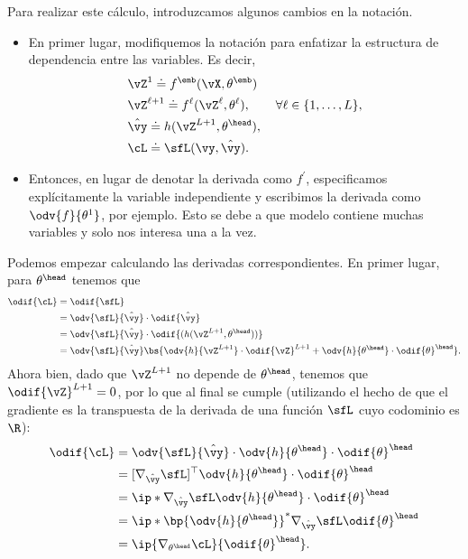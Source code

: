 \documentclass[../../book-main_es.tex]{subfiles}
\begin{document}
Para realizar este cálculo, introduzcamos algunos cambios en la notación.
\begin{itemize}
    \item En primer lugar, modifiquemos la notación para enfatizar la
        estructura de dependencia entre las variables. Es decir,
        \begin{align}
            &\vZ^{1} \doteq f^{\emb}(\vX, \theta^{\emb}) \\
            &\vZ^{\ell + 1} \doteq f^{\ell}(\vZ^{\ell},
            \theta^{\ell}), \qquad \forall \ell \in \{1, \dots, L\}, \\
            &\hat{\vy} \doteq h(\vZ^{L+1}, \theta^{\head}), \\
            &\cL \doteq \sfL(\vy, \hat{\vy}).
        \end{align}
    \item Entonces, en lugar de denotar la derivada como \(f^{\prime}\),
        especificamos explícitamente la variable independiente y escribimos la
        derivada como \(\odv{f}{\theta^{1}}\), por ejemplo. Esto se debe
        a que modelo contiene muchas variables y solo 
        nos interesa una a la vez.
\end{itemize}
Podemos empezar calculando las derivadas correspondientes. En primer lugar, para
\(\theta^{\head}\) tenemos que
\begin{align}
    \odif{\cL}
    &= \odif{\sfL} \\
    &= \odv{\sfL}{\hat{\vy}}\cdot\odif{\hat{\vy}} \\
    &= \odv{\sfL}{\hat{\vy}}\cdot\odif{{(h(\vZ^{L + 1}, \theta^{\head}))}} \\
    &= \odv{\sfL}{\hat{\vy}}\bs{\odv{h}{\vZ^{L +
        1}}\cdot\odif{\vZ}^{L + 1} +
    \odv{h}{\theta^{\head}}\cdot\odif{\theta}^{\head}}.
\end{align}
Ahora bien, dado que \(\vZ^{L + 1}\) no depende de \(\theta^{\head}\), tenemos
que \(\odif{\vZ}^{L + 1} = 0\), por lo que al final se cumple (utilizando el
    hecho de que el gradiente es la transpuesta de la derivada de una
función \(\sfL\) cuyo codominio es \(\R\)):
\begin{align}
    \odif{\cL}
    &=
    \odv{\sfL}{\hat{\vy}}\cdot\odv{h}{\theta^{\head}}\cdot\odif{\theta}^{\head}
    \\
    &=
    [\nabla_{\hat{\vy}}\sfL]^{\top}\odv{h}{\theta^{\head}}\cdot\odif{\theta}^{\head}
    \\
    &=
    \ip*{\nabla_{\hat{\vy}}\sfL}{\odv{h}{\theta^{\head}}\cdot\odif{\theta}^{\head}}
    \\
    &=
    \ip*{\bp{\odv{h}{\theta^{\head}}}^{*}\nabla_{\hat{\vy}}\sfL}{\odif{\theta}^{\head}}
    \\
    &= \ip{\nabla_{\theta^{\head}}\cL}{\odif{\theta}^{\head}}.
\end{align}
\end{document}
